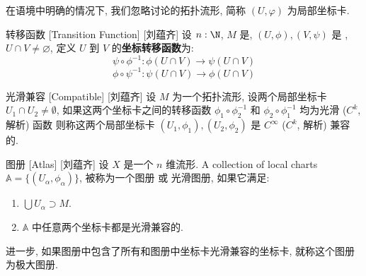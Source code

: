 \documentclass[UTF8]{ctexart}
\begin{document}
        \begin{rmk}
            [猫猫]
            在语境中明确的情况下, 我们忽略讨论的拓扑流形, 简称 \((U,\varphi)\) 为局部坐标卡. 
        \end{rmk}

        \begin{dfn}
            {转移函数}
            [Transition Function]
            [刘蕴齐]
            设 \(n:\N\), \(M\) 是, \((U,\phi), (V,\psi)\) 是 , \(U \cap V \neq \varnothing\), 定义 \(U\) 到 \(V\) 的\textbf{坐标转移函数}为: 
            \[ \psi \circ \phi^{-1}:\phi(U \cap V) \to \psi(U \cap V)\]
            \[ \phi \circ \psi^{-1}:\psi(U \cap V) \to \phi(U \cap V)\]
        \end{dfn}

        \begin{dfn}
            []
            {光滑兼容}
            [Compatible]
            [刘蕴齐]
            设 \(M\) 为一个拓扑流形,
            设两个局部坐标卡 \( U_1 \cap U_2 \neq \emptyset \),
            如果这两个坐标卡之间的转移函数
             \( \phi_1 \circ \phi_2^{-1} \) 和
             \( \phi_2 \circ \phi_1^{-1} \) 
            均为光滑 (\(C^k\), 解析) 函数
            则称这两个局部坐标卡 \( (U_1, \phi_1), (U_2, \phi_2) \)  是 \(C^{\infty}\)  (\(C^k\), 解析) 兼容的. 
        \end{dfn}

        \begin{dfn}
            [Atlas]
            {图册}
            [Atlas]
            [刘蕴齐]
            设  \(X\)  是一个  \(n\)  维流形.  
            A collection of local charts 
             \(\mathbb{A} = \{(U_{\alpha},\phi_{\alpha})\}\),
            被称为一个图册 或 光滑图册, 
            如果它满足:
            \begin{enumerate}
                \item  \(\bigcup U_{\alpha} \supset M\). 
                \item  \(\mathbb{A}\) 中任意两个坐标卡都是光滑兼容的. 
            \end{enumerate}
            进一步, 如果图册中包含了所有和图册中坐标卡光滑兼容的坐标卡, 就称这个图册为极大图册. 
        \end{dfn}
\end{document}
